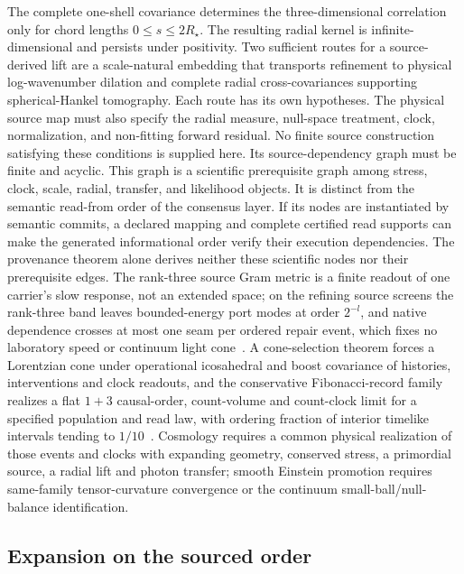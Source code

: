 \documentclass[11pt]{article}
\theoremstyle{remark}
\begin{document}
The complete one-shell covariance determines the three-dimensional correlation
only for chord lengths \(0\le s\le2R_\star\). The resulting radial kernel is
infinite-dimensional and persists under positivity. Two sufficient routes
for a source-derived lift are a scale-natural embedding that transports
refinement to physical log-wavenumber dilation and complete radial
cross-covariances supporting spherical-Hankel tomography. Each route has its
own hypotheses. The physical source map must also specify
the radial measure, null-space treatment, clock, normalization, and non-fitting
forward residual. No finite source construction satisfying these conditions is
supplied here. Its source-dependency graph must be finite and acyclic.
This graph is a scientific prerequisite graph among stress, clock, scale,
radial, transfer, and likelihood objects. It is distinct from the semantic
read-from order of the consensus layer. If its nodes are instantiated by
semantic commits, a declared mapping and complete certified read supports can
make the generated informational order verify their execution dependencies.
The provenance theorem alone derives neither these scientific nodes nor their
prerequisite edges.
The rank-three source Gram metric is a finite readout of one carrier's slow
response, not an extended space; on the refining source screens the
rank-three band leaves bounded-energy port modes at order \(2^{-l}\), and
native dependence crosses at most one seam per ordered repair event, which
fixes no laboratory speed or continuum light
cone~\cite{ophmodel,ophcontinuum,ophcausality}. A cone-selection theorem
forces a Lorentzian cone under operational icosahedral and boost covariance
of histories, interventions and clock readouts, and the conservative
Fibonacci-record family realizes a flat \(1+3\) causal-order, count-volume
and count-clock limit for a specified population and read law, with
ordering fraction of interior timelike intervals tending to
\(1/10\)~\cite{ophEinstein}. Cosmology requires a common physical realization of
those events and clocks with expanding geometry, conserved stress, a
primordial source, a radial lift and photon transfer; smooth Einstein
promotion requires same-family tensor-curvature convergence or the continuum
small-ball/null-balance identification.

\subsection{Expansion on the sourced order}
\end{document}
